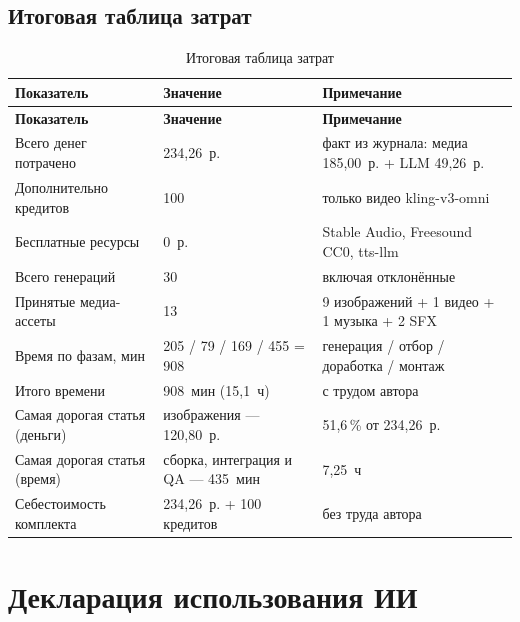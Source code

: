 \documentclass[12pt, a4paper]{article}
\begin{document}
\subsection{Итоговая таблица затрат}
\begin{small}
\setlength{\tabcolsep}{4pt}
\begin{longtable}{@{}L{5.2cm}L{3.6cm}L{5.8cm}@{}}
\caption{Итоговая таблица затрат}\label{tab:summary}\\
\toprule
\textbf{Показатель} & \textbf{Значение} & \textbf{Примечание} \\
\midrule
\endfirsthead
\toprule
\textbf{Показатель} & \textbf{Значение} & \textbf{Примечание} \\
\midrule
\endhead
\bottomrule
\endlastfoot
Всего денег потрачено & 234{,}26~р. & факт из журнала: медиа 185{,}00~р. + LLM 49{,}26~р. \\
\addlinespace
Дополнительно кредитов & 100 & только видео kling-v3-omni \\
\addlinespace
Бесплатные ресурсы & 0~р. & Stable Audio, Freesound CC0, tts-llm \\
\addlinespace
Всего генераций & 30 & включая отклонённые \\
\addlinespace
Принятые медиа-ассеты & 13 & 9 изображений + 1 видео + 1 музыка + 2 SFX \\
\addlinespace
Время по фазам, мин & 205 / 79 / 169 / 455 = 908 & генерация / отбор / доработка / монтаж \\
\addlinespace
Итого времени & 908~мин (15{,}1~ч) & с трудом автора \\
\addlinespace
Самая дорогая статья (деньги) & изображения --- 120{,}80~р. & 51{,}6\,\% от 234{,}26~р. \\
\addlinespace
Самая дорогая статья (время) & сборка, интеграция и QA --- 435~мин & 7{,}25~ч \\
\addlinespace
Себестоимость комплекта & 234{,}26~р. + 100 кредитов & без труда автора \\
\end{longtable}
\end{small}

\section{Декларация использования ИИ}
\end{document}
